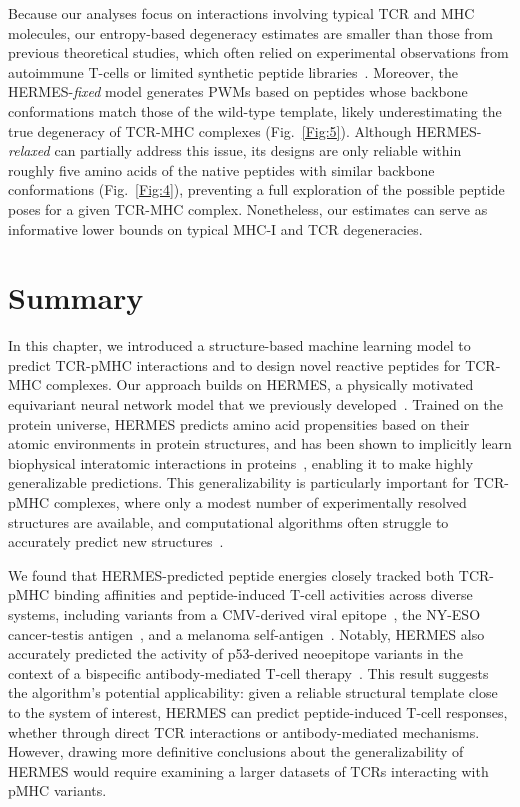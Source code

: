 Because our analyses focus on interactions involving typical TCR and MHC molecules, our
entropy-based degeneracy estimates are smaller than those from previous theoretical studies, which
often relied on experimental observations from autoimmune T-cells or limited synthetic peptide
libraries~\cite{Sewell2012-du}. Moreover, the HERMES-{\em fixed} model generates PWMs based on
peptides whose backbone conformations match those of the wild-type template, likely underestimating
the true degeneracy of TCR-MHC complexes (Fig.~\ref{Fig:5}). Although HERMES-{\em relaxed} can
partially address this issue, its designs are only reliable within roughly five amino acids of the
native peptides {with similar backbone conformations (Fig.~\ref{Fig:4})}, preventing a full
exploration of the possible peptide poses for a given TCR-MHC complex. Nonetheless, our estimates
can serve as informative lower bounds on typical MHC-I and TCR degeneracies.


\section{Summary}

In this chapter, we introduced a structure-based machine learning model to predict TCR-pMHC
interactions and to design novel reactive peptides for TCR-MHC complexes. Our approach builds on
HERMES, a physically motivated equivariant neural network model that we previously
developed~\cite{Visani2024-sh,Pun2024-qz}. Trained on the protein universe, HERMES predicts amino
acid propensities based on their atomic environments in protein structures, and has been shown to
implicitly learn biophysical interatomic interactions in proteins~\cite{Pun2024-qz}, enabling it to
make highly generalizable predictions. This generalizability is particularly important for TCR-pMHC
complexes, where only a modest number of experimentally resolved structures are available, and
computational algorithms often struggle to accurately predict new
structures~\cite{Bradley2023-rl,Yin2023-zm}.

We found that HERMES-predicted peptide energies closely tracked both TCR-pMHC binding affinities and
peptide-induced T-cell activities across diverse systems, including variants from a CMV-derived
viral epitope~\cite{Luksza2022-gx}, the NY-ESO cancer-testis
antigen~\cite{Aleksic2010-wz,Pettmann2021-kl}, and a melanoma self-antigen~\cite{Luksza2022-gx}.
Notably, HERMES also accurately predicted the activity of p53-derived neoepitope variants in the
context of a bispecific antibody-mediated T-cell therapy~\cite{Hsiue2021-ag}. This result
suggests the algorithm's potential applicability: given a reliable structural template close to the
system of interest, HERMES can predict peptide-induced T-cell responses, whether through direct TCR
interactions or antibody-mediated mechanisms. However, drawing more definitive conclusions about
the generalizability of HERMES would require examining a larger datasets of TCRs interacting with
pMHC variants.

